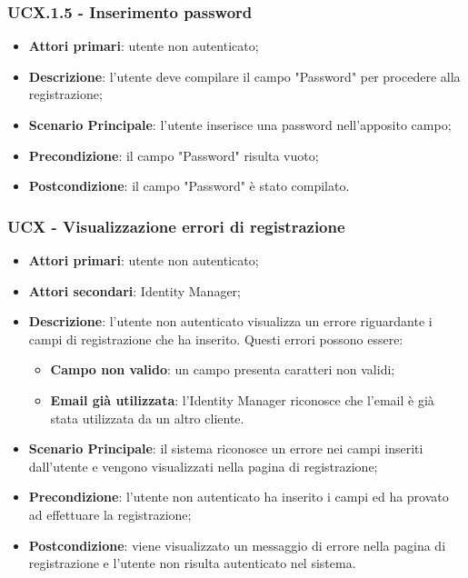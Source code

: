 \subsubsection{UCX.1.5 - Inserimento password}
\begin{itemize}
\item \textbf{Attori primari}: utente non autenticato;
\item \textbf{Descrizione}: l'utente deve compilare il campo "Password" per procedere alla registrazione;
\item \textbf{Scenario Principale}: l'utente inserisce una password nell'apposito campo;
\item \textbf{Precondizione}: il campo "Password" risulta vuoto;
\item \textbf{Postcondizione}: il campo "Password" è stato compilato.
\end{itemize}

\subsubsection{UCX - Visualizzazione errori di registrazione}
\begin{itemize}
\item \textbf{Attori primari}: utente non autenticato;
\item \textbf{Attori secondari}: Identity Manager;
\item \textbf{Descrizione}: l'utente non autenticato visualizza un errore riguardante i campi di registrazione che ha inserito. Questi errori possono essere:
\begin{itemize}
\item \textbf{Campo non valido}: un campo presenta caratteri non validi;
\item \textbf{Email già utilizzata}: l'Identity Manager riconosce che l'email è già stata utilizzata da un altro cliente.
\end{itemize}
\item \textbf{Scenario Principale}: il sistema riconosce un errore nei campi inseriti dall'utente e vengono visualizzati nella pagina di registrazione;
\item \textbf{Precondizione}: l'utente non autenticato ha inserito i campi ed ha provato ad effettuare la registrazione;
\item \textbf{Postcondizione}: viene visualizzato un messaggio di errore nella pagina di registrazione e l'utente non risulta autenticato nel sistema.
\end{itemize}

